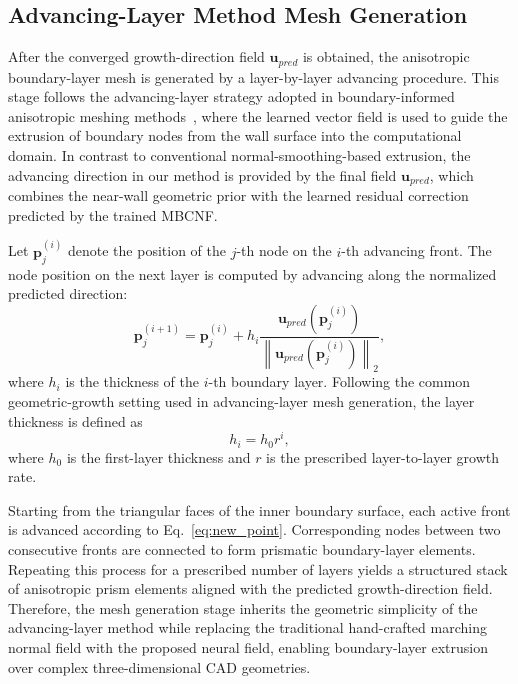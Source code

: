 \documentclass[%
 aip,
 amsmath,amssymb,
 reprint,%
nobibnotes,
]{revtex4-1}
\begin{document}
\subsection{\label{sec:level1-7}Advancing-Layer Method Mesh Generation}

After the converged growth-direction field $\mathbf{u}_{pred}$ is obtained, the anisotropic boundary-layer mesh is generated by a layer-by-layer advancing procedure.
This stage follows the advancing-layer strategy adopted in boundary-informed anisotropic meshing methods~\cite{anisoMeshNet}, where the learned vector field is used to guide the extrusion of boundary nodes from the wall surface into the computational domain.
In contrast to conventional normal-smoothing-based extrusion, the advancing direction in our method is provided by the final field \(\mathbf{u}_{pred}\), which combines the near-wall geometric prior with the learned residual correction predicted by the trained MBCNF.

Let $\mathbf{p}_{j}^{(i)}$ denote the position of the $j$-th node on the $i$-th advancing front. The node position on the next layer is computed by advancing along the normalized predicted direction:
\begin{equation}
    \mathbf{p}_{j}^{(i+1)}
    =
    \mathbf{p}_{j}^{(i)}
    +
    h_i
    \frac{
    \mathbf{u}_{pred}\left(\mathbf{p}_{j}^{(i)}\right)
    }{
    \left\|
    \mathbf{u}_{pred}\left(\mathbf{p}_{j}^{(i)}\right)
    \right\|_2
    },
    \label{eq:new_point}
\end{equation}
where $h_i$ is the thickness of the $i$-th boundary layer. Following the common geometric-growth setting used in advancing-layer mesh generation, the layer thickness is defined as
\begin{equation}
    h_i = h_0 r^i,
    \label{eq:layer_thickness}
\end{equation}
where $h_0$ is the first-layer thickness and $r$ is the prescribed layer-to-layer growth rate.

Starting from the triangular faces of the inner boundary surface, each active front is advanced according to Eq.~\eqref{eq:new_point}.
Corresponding nodes between two consecutive fronts are connected to form prismatic boundary-layer elements. Repeating this process for a prescribed number of layers yields a structured stack of anisotropic prism elements aligned with the predicted growth-direction field. Therefore, the mesh generation stage inherits the geometric simplicity of the advancing-layer method while replacing the traditional hand-crafted marching normal field with the proposed neural field, enabling boundary-layer extrusion over complex three-dimensional CAD geometries.
\end{document}
